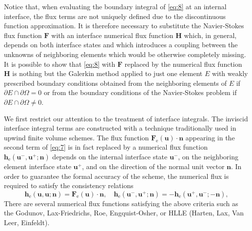 \documentclass{develop-note}
\begin{document}
Notice that, when evaluating the boundary integral of \autoref{eq:8} at an internal interface, the flux terms are not uniquely defined due to the discontinuous function approximation. It is therefore necessary to substitute the Navier-Stokes flux function $\mathbf{F}$ with an interface numerical flux function $\mathbf{H}$ which, in general, depends on both interface states and which introduces a coupling between the unknowns of neighboring elements which would be otherwise completely missing. It is possible to show that \autoref{eq:8} with $\mathbf{F}$ replaced by the numerical flux function $\mathbf{H}$ is nothing but the Galerkin method applied to just one element $E$ with weakly prescribed boundary conditions obtained from the neighboring elements of $E$ if $\partial E\cap\partial\Omega =0$ or from the boundary conditions of the Navier-Stokes problem if $\partial E\cap\partial\Omega\neq 0$.

We first restrict our attention to the treatment of interface integrals. The inviscid interface integral terms are constructed with a technique traditionally used in upwind finite volume schemes. The flux function $\mathbf{F}_{\mathrm{e}}(\mathbf{u})\cdot\mathbf{n}$ appearing in the second term of \autoref{eq:7} is in fact replaced by a numerical flux function $\mathbf{h}_{\mathrm{e}}(\mathbf{u}^{-},\mathbf{u}^{+};\mathbf{n})$ depends on the internal interface state $\mathbf{u}^{-}$, on the neighboring element interface state $\mathbf{u}^{+}$, and on the direction of the normal unit vector $\mathbf{n}$. In order to guarantee the formal accuracy of the scheme, the numerical flux is required to satisfy the consistency relations
\begin{equation}
  \mathbf{h}_{\mathrm{e}}(\mathbf{u},\mathbf{u};\mathbf{n})=\mathbf{F}_{\mathrm{e}}(\mathbf{u})\cdot\mathbf{n},\quad\mathbf{h}_{\mathrm{e}}(\mathbf{u}^{-},\mathbf{u}^{+};\mathbf{n})=-\mathbf{h}_{\mathrm{e}}(\mathbf{u}^{+},\mathbf{u}^{-};-\mathbf{n}),
\end{equation}
There are several numerical flux functions satisfying the above criteria such as the Godunov, Lax-Friedrichs, Roe, Engquist-Osher, or HLLE (Harten, Lax, Van Leer, Einfeldt).
\end{document}
